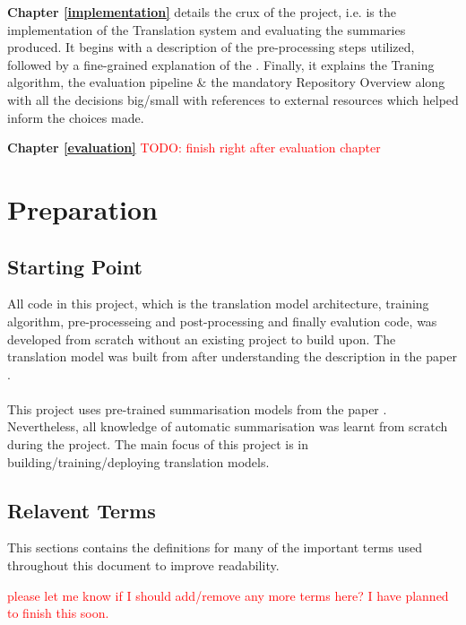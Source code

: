 \documentclass[12pt,a4paper,twoside,openright]{report}
\newcommand{\red}[1]{\textcolor{red}{#1}}
\begin{document}
\textbf{Chapter \ref{implementation} } details the crux of the project, i.e. is the implementation of the Translation system and evaluating the summaries produced. It begins with a description of the pre-processing steps utilized, followed by a fine-grained explanation of the . Finally, it explains the Traning algorithm, the evaluation pipeline \& the mandatory Repository Overview along with all the decisions big/small with references to external resources which helped inform the choices made. 

\textbf{Chapter \ref{evaluation} }
\red{TODO: finish right after evaluation chapter}

\chapter{Preparation}
\label{preperation}

\section{Starting Point}
\label{starting-point}
All code in this project, which is the translation model architecture, training algorithm, pre-processeing and post-processing and finally evalution code, was developed from scratch without an existing project to build upon. The translation model was built from after understanding the description in the paper \cite{transformers}.
\\\\
This project uses pre-trained summarisation models from the paper \cite{summary}. Nevertheless, all knowledge of automatic summarisation was learnt from scratch during the project. The main focus of this project is in building/training/deploying translation models. 

\section{Relavent Terms}
This sections contains the definitions for many of the important terms used throughout this document to improve readability. 

\red{please let me know if I should add/remove any more terms here? I have planned to finish this soon.}
\end{document}
